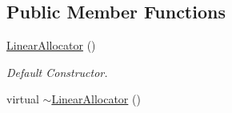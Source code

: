 \subsection*{Public Member Functions}
\begin{DoxyCompactItemize}
\item 
\hyperlink{classDE_1_1LinearAllocator_a39842c06f25b2eab2dd5ea4a204ad047}{Linear\+Allocator} ()\hypertarget{classDE_1_1LinearAllocator_a39842c06f25b2eab2dd5ea4a204ad047}{}\label{classDE_1_1LinearAllocator_a39842c06f25b2eab2dd5ea4a204ad047}

\begin{DoxyCompactList}\small\item\em Default Constructor. \end{DoxyCompactList}\item 
virtual \hyperlink{classDE_1_1LinearAllocator_a4ee6390f3ad8b726c142db0486d60fe2}{$\sim$\+Linear\+Allocator} ()\hypertarget{classDE_1_1LinearAllocator_a4ee6390f3ad8b726c142db0486d60fe2}{}\label{classDE_1_1LinearAllocator_a4ee6390f3ad8b726c142db0486d60fe2}


\end{DoxyCompactItemize}
